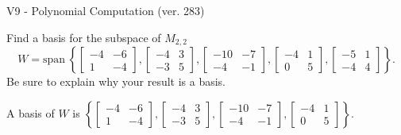 \begin{exercise}
  \begin{exerciseTitle}V9 - Polynomial Computation (ver. 283)\end{exerciseTitle}
  \begin{exerciseStatement}
    Find a basis for the subspace of \(M_{2,2}\) 
\[W=\mathrm{span}\ \left\{\left[\begin{array}{cc}
-4 & -6 \\
1 & -4
\end{array}\right] , \left[\begin{array}{cc}
-4 & 3 \\
-3 & 5
\end{array}\right] , \left[\begin{array}{cc}
-10 & -7 \\
-4 & -1
\end{array}\right] , \left[\begin{array}{cc}
-4 & 1 \\
0 & 5
\end{array}\right] , \left[\begin{array}{cc}
-5 & 1 \\
-4 & 4
\end{array}\right]\right\}.\]
 Be sure to explain why your result is a basis.


  \end{exerciseStatement}
  \begin{exerciseAnswer}
   A basis of \(W\) is  \(\left\{\left[\begin{array}{cc}
-4 & -6 \\
1 & -4
\end{array}\right] , \left[\begin{array}{cc}
-4 & 3 \\
-3 & 5
\end{array}\right] , \left[\begin{array}{cc}
-10 & -7 \\
-4 & -1
\end{array}\right] , \left[\begin{array}{cc}
-4 & 1 \\
0 & 5
\end{array}\right]\right\}\).
  


  \end{exerciseAnswer}
\end{exercise}